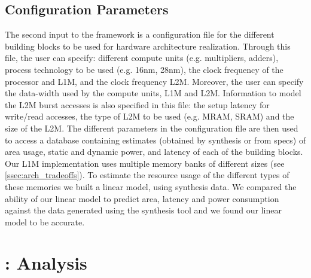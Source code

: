 \vspace{-1mm}
\subsection{Configuration Parameters}
\label{ssec:conf_param}
\vspace{-1mm}
The second input to the framework is a configuration file for the different building blocks to be used for hardware architecture realization. Through this file, the user can specify: different compute units (e.g. multipliers, adders), process technology to be used (e.g. 16nm, 28nm), the clock frequency of the processor and L1M, and the clock frequency L2M. Moreover, the user can specify the data-width used by the compute units, L1M and L2M.
Information to model the L2M burst accesses is also specified in this file: the setup latency for write/read accesses, the type of L2M to be used (e.g. MRAM, SRAM) and the size of the L2M. The different parameters in the configuration file are then used to access a database containing estimates (obtained by synthesis or from specs) of area usage, static and dynamic power, and latency of each of the building blocks. Our L1M implementation uses multiple memory banks of different sizes (see \ref{ssec:arch_tradeoffs}). To estimate the resource usage of the different types of these memories we built a linear model, using synthesis data. We compared the ability of our linear model to predict area, latency and power consumption against the data generated using the synthesis tool and we found our linear model to be accurate.

%

\section{\frameworkname: Analysis}
\vspace{-1mm}
